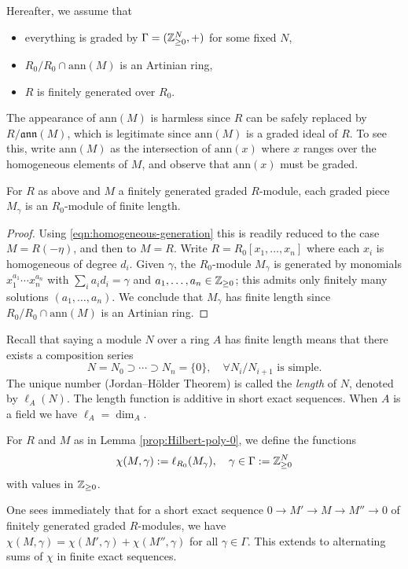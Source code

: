 Hereafter, we assume that
\begin{itemize}
	\item everything is graded by $\Gamma = (\mathbb{Z}^N_{\geq 0}, +)$ for some fixed $N$,
	\item $R_0/R_0 \cap \mathrm{ann}(M)$ is an Artinian ring,
	\item $R$ is finitely generated over $R_0$.
\end{itemize}
The appearance of $\mathrm{ann}(M)$ is harmless since $R$ can be safely replaced by $R/\mathfrak{ann}(M)$, which is legitimate since $\mathrm{ann}(M)$ is a graded ideal of $R$. To see this, write $\mathrm{ann}(M)$ as the intersection of $\mathrm{ann}(x)$ where $x$ ranges over the homogeneous elements of $M$, and observe that $\mathrm{ann}(x)$ must be graded.

\begin{lemma}\label{prop:Hilbert-poly-0}
	For $R$ as above and $M$ a finitely generated graded $R$-module, each graded piece $M_\gamma$ is an $R_0$-module of finite length.
\end{lemma}
\begin{proof}
	Using \eqref{eqn:homogeneous-generation} this is readily reduced to the case $M = R(-\eta)$, and then to $M=R$. Write $R = R_0[x_1, \ldots, x_n]$ where each $x_i$ is homogeneous of degree $d_i$. Given $\gamma$, the $R_0$-module $M_\gamma$ is generated by monomials $x_1^{a_1} \cdots x_n^{a_n}$ with $\sum_i a_i d_i = \gamma$ and $a_1, \ldots, a_n \in \mathbb{Z}_{\geq 0}$; this admits only finitely many solutions $(a_1, \ldots, a_n)$. We conclude that $M_\gamma$ has finite length since $R_0/R_0 \cap \text{ann}(M)$ is an Artinian ring.
\end{proof}

Recall that saying a module $N$ over a ring $A$ has finite length means that there exists a composition series
\[ N = N_0 \supset \cdots \supset N_n = \{0\}, \quad \forall N_i/N_{i+1} \text{ is simple.} \]
The unique number (Jordan--Hölder Theorem) is called the \emph{length} of $N$, denoted by $\ell_A(N)$. The length function is additive in short exact sequences. When $A$ is a field we have $\ell_A = \dim_A$. 

\begin{definition}
	For $R$ and $M$ as in Lemma \ref{prop:Hilbert-poly-0}, we define the functions
	\[ \chi(M, \gamma) := \ell_{R_0}(M_\gamma), \quad \gamma \in \Gamma := \mathbb{Z}_{\geq 0}^N \]
	with values in $\mathbb{Z}_{\geq 0}$.
\end{definition}
One sees immediately that for a short exact sequence $0 \to M' \to M \to M'' \to 0$ of finitely generated graded $R$-modules, we have $\chi(M,\gamma) = \chi(M',\gamma) + \chi(M'',\gamma)$ for all $\gamma \in \Gamma$. This extends to alternating sums of $\chi$ in finite exact sequences.

